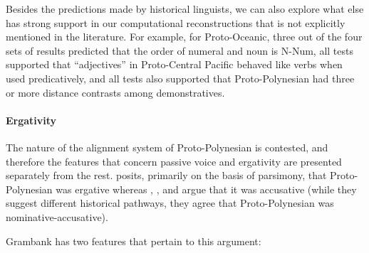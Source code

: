 \documentclass[draft,10pt]{article} %
\begin{document}
%
%

Besides the predictions made by historical linguists, we can also explore what else has strong support in our computational reconstructions that is not explicitly mentioned in the literature. For example, for Proto-Oceanic, three out of the four sets of results predicted that the order of numeral and noun is N-Num, all tests supported that ``adjectives'' in Proto-Central Pacific behaved like verbs when used predicatively, and all tests also supported that Proto-Polynesian had three or more distance contrasts among demonstratives. 

\paragraph{Ergativity}
The nature of the alignment system of Proto-Polynesian is contested, and therefore the features that concern passive voice and ergativity are presented separately from the rest. \citet{clark1976aspects} posits, primarily on the basis of parsimony, that Proto-Polynesian was ergative whereas \citet{hale_1968}, \citet{hohepa_1967,hohepa_1969}, and \citet{chung1978} argue that it was accusative (while they suggest different historical pathways, they agree that Proto-Polynesian was nominative-accusative).

Grambank has two features that pertain to this argument:
\end{document}
